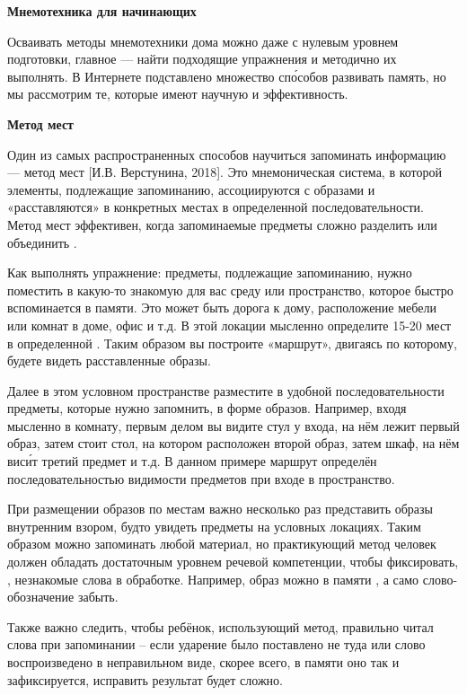 \textbf{Мнемотехника для начинающих}

Осваивать методы мнемотехники дома можно даже с нулевым уровнем подготовки, главное --- найти подходящие упражнения и методично их выполнять. В Интернете подставлено множество сп\'{о}собов развивать память, но мы рассмотрим те, которые имеют научную  и эффективность.

\textbf{Метод мест}

Один из самых распространенных способов научиться запоминать информацию ---  метод мест [И.В. Верстунина, 2018]. Это мнемоническая система, в которой элементы, подлежащие запоминанию, ассоциируются с образами и «расставляются» в конкретных местах в определенной последовательности. Метод мест эффективен, когда запоминаемые предметы сложно разделить или объединить .

Как выполнять упражнение: предметы, подлежащие запоминанию, нужно поместить в какую-то знакомую для вас среду или пространство, которое быстро вспоминается в памяти. Это может быть дорога к дому, расположение мебели или комнат в доме, офис и т.д. В этой локации мысленно определите 15-20 мест в определенной . Таким образом вы построите «маршрут», двигаясь по которому, будете видеть расставленные образы.

Далее в этом условном пространстве разместите в удобной последовательности предметы, которые нужно запомнить, в форме образов. Например, входя мысленно в комнату, первым делом вы видите стул у входа, на нём лежит первый образ, затем стоит стол, на котором расположен второй образ, затем шкаф, на нём вис\'{и}т третий предмет и т.д. В данном примере маршрут  определён последовательностью видимости предметов при входе в пространство.

При размещении образов по местам важно несколько раз представить образы внутренним взором, будто увидеть предметы на условных локациях. Таким образом можно запоминать любой материал, но практикующий метод человек должен обладать достаточным уровнем речевой компетенции, чтобы фиксировать, , незнакомые слова в обработке. Например, образ можно в памяти , а само слово-обозначение забыть.

Также важно следить, чтобы ребёнок, использующий метод, правильно читал слова при запоминании – если ударение было поставлено не туда или слово воспроизведено в неправильном виде, скорее всего, в памяти оно так и зафиксируется, исправить результат будет сложно.

